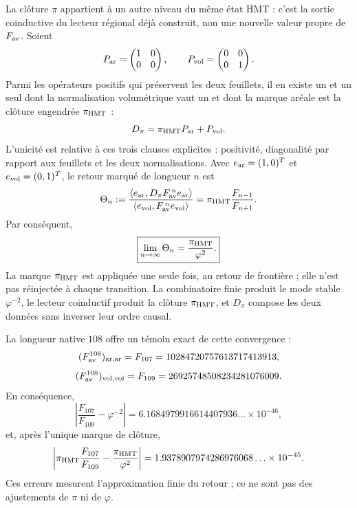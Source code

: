 La clôture \(\pi\) appartient à un autre niveau du même état HMT : c'est la sortie
coinductive du lecteur régional déjà construit, non une nouvelle valeur propre de
\(F_{\rm av}\). Soient
\[
 P_{\rm ar}=
 \begin{pmatrix}1&0\\0&0\end{pmatrix},
 \qquad
 P_{\rm vol}=
 \begin{pmatrix}0&0\\0&1\end{pmatrix}.
\]
Parmi les opérateurs positifs qui préservent les deux feuillets, il en existe un et un
seul dont la normalisation volumétrique vaut un et dont la marque aréale est la clôture
engendrée \(\pi_{\rm HMT}\) :
\[
 D_\pi=\pi_{\rm HMT}P_{\rm ar}+P_{\rm vol}.
\]
L'unicité est relative à ces trois clauses explicites : positivité,
diagonalité par rapport aux feuillets et les deux normalisations. Avec
\(e_{\rm ar}=(1,0)^T\) et \(e_{\rm vol}=(0,1)^T\), le retour marqué de
longueur \(n\) est
\[
 \Theta_n
 :=
 \frac{\langle e_{\rm ar},
 D_\pi F_{\rm av}^{\,n}e_{\rm ar}\rangle}
 {\langle e_{\rm vol},
 F_{\rm av}^{\,n}e_{\rm vol}\rangle}
 =
 \pi_{\rm HMT}\frac{F_{n-1}}{F_{n+1}}.
\]
Par conséquent,
\[
 \boxed{\displaystyle
 \lim_{n\to\infty}\Theta_n
 =\frac{\pi_{\rm HMT}}{\varphi^2}.}
\]
La marque \(\pi_{\rm HMT}\) est appliquée une seule fois, au retour de frontière ;
elle n'est pas réinjectée à chaque transition. La combinatoire finie produit le mode
stable \(\varphi^{-2}\), le lecteur coinductif produit la clôture
\(\pi_{\rm HMT}\), et \(D_\pi\) compose les deux données sans inverser leur ordre
causal.

La longueur native \(108\) offre un témoin exact de cette convergence :
\[
 (F_{\rm av}^{108})_{\rm ar,ar}
 =F_{107}=10284720757613717413913,
\]
\[
 (F_{\rm av}^{108})_{\rm vol,vol}
 =F_{109}=26925748508234281076009.
\]
En conséquence,
\[
 \left|
 \frac{F_{107}}{F_{109}}-\varphi^{-2}
 \right|
 =
 6.1684979916614407936\ldots\times10^{-46},
\]
et, après l'unique marque de clôture,
\[
 \left|
 \pi_{\rm HMT}\frac{F_{107}}{F_{109}}
 -\frac{\pi_{\rm HMT}}{\varphi^2}
 \right|
 =
 1.9378907974286976068\ldots\times10^{-45}.
\]
Ces erreurs mesurent l'approximation finie du retour ; ce ne sont pas des ajustements de
\(\pi\) ni de \(\varphi\).

